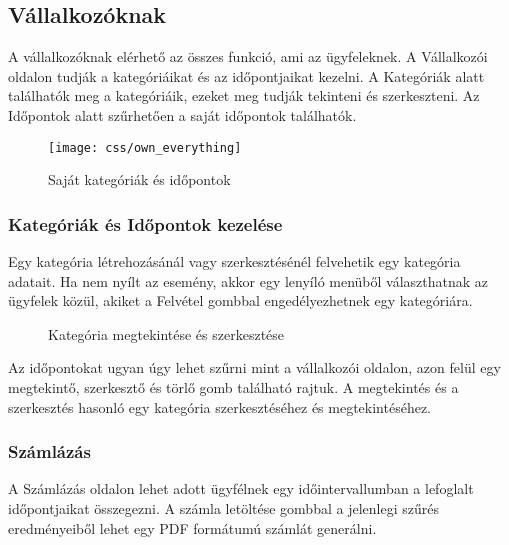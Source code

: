 \clearpage

\subsection{Vállalkozóknak}

A vállalkozóknak elérhető az összes funkció, ami az ügyfeleknek. A Vállalkozói oldalon tudják a kategóriáikat és az időpontjaikat kezelni. A Kategóriák alatt találhatók meg a kategóriáik, ezeket meg tudják tekinteni és szerkeszteni. Az Időpontok alatt szűrhetően a saját időpontok találhatók.

\begin{figure}[H]
    \centering
    \texttt{[image: css/own\_everything]}
    \caption{Saját kategóriák és időpontok}
\end{figure}

\clearpage

\subsubsection{Kategóriák és Időpontok kezelése}

Egy kategória létrehozásánál vagy szerkesztésénél felvehetik egy kategória adatait. Ha nem nyílt az esemény, akkor egy lenyíló menüből választhatnak az ügyfelek közül, akiket a Felvétel gombbal engedélyezhetnek egy kategóriára.

\begin{figure}[H]
    \centering
    \caption{Kategória megtekintése és szerkesztése}
\end{figure}

Az időpontokat ugyan úgy lehet szűrni mint a vállalkozói oldalon, azon felül egy megtekintő, szerkesztő és törlő gomb található rajtuk. A megtekintés és a szerkesztés hasonló egy kategória szerkesztéséhez és megtekintéséhez.

\clearpage

\subsubsection{Számlázás}

A Számlázás oldalon lehet adott ügyfélnek egy időintervallumban a lefoglalt időpontjaikat összegezni. A számla letöltése gombbal a jelenlegi szűrés eredményeiből lehet egy PDF formátumú számlát generálni.

